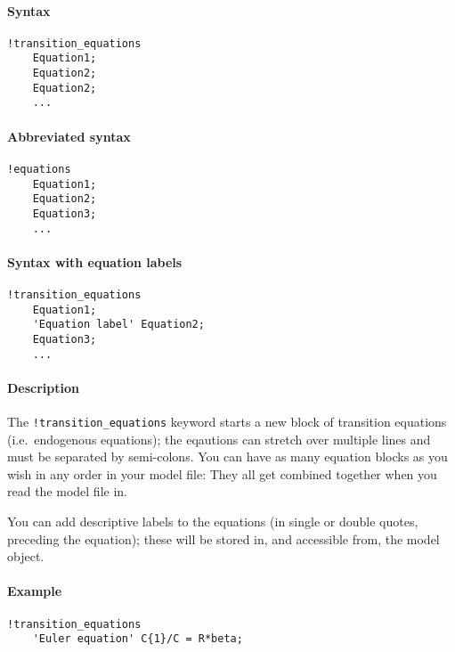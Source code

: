 


	\paragraph{Syntax}\label{syntax}

\begin{verbatim}
!transition_equations
    Equation1;
    Equation2;
    Equation2;
    ...
\end{verbatim}

\paragraph{Abbreviated syntax}\label{abbreviated-syntax}

\begin{verbatim}
!equations
    Equation1;
    Equation2;
    Equation3;
    ...
\end{verbatim}

\paragraph{Syntax with equation
labels}\label{syntax-with-equation-labels}

\begin{verbatim}
!transition_equations
    Equation1;
    'Equation label' Equation2;
    Equation3;
    ...
\end{verbatim}

\paragraph{Description}\label{description}

The \texttt{!transition\_equations} keyword starts a new block of
transition equations (i.e.~endogenous equations); the eqautions can
stretch over multiple lines and must be separated by semi-colons. You
can have as many equation blocks as you wish in any order in your model
file: They all get combined together when you read the model file in.

You can add descriptive labels to the equations (in single or double
quotes, preceding the equation); these will be stored in, and accessible
from, the model object.

\paragraph{Example}\label{example}

\begin{verbatim}
!transition_equations
    'Euler equation' C{1}/C = R*beta;
\end{verbatim}


